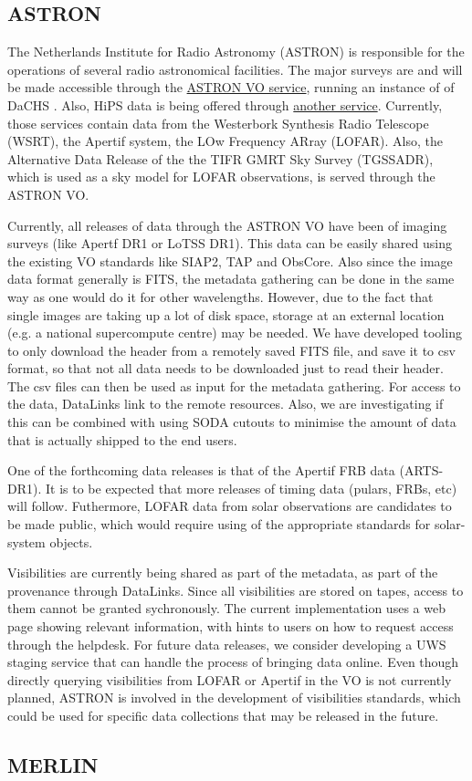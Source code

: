 \documentclass[11pt,a4paper]{ivoa}
\begin{document}
\subsection{ASTRON}\label{sec:Astron}
The Netherlands Institute for Radio Astronomy (ASTRON) is responsible for the operations of several radio astronomical facilities. The major surveys are and will be made accessible through the   {\href{https://vo.astron.nl/}{ASTRON VO service}}, running an instance of of DaCHS \citep{10.1016/j.ascom.2014.08.003}. Also, HiPS data is being offered through \href{https://hips.astron.nl/}{another service}. Currently, those services contain data from the Westerbork Synthesis Radio Telescope (WSRT), the Apertif system, the LOw Frequency ARray (LOFAR). Also, the Alternative Data Release of the the TIFR GMRT Sky Survey (TGSSADR), which is used as a sky model for LOFAR observations, is served through the ASTRON VO.

Currently, all releases of data through the ASTRON VO have been of imaging surveys (like Apertf DR1 or LoTSS DR1). This data can be easily shared using the existing VO standards like SIAP2, TAP and ObsCore. Also since the image data format generally is FITS, the metadata gathering can be done in the same way as one would do it for other wavelengths. However, due to the fact that single images are taking up a lot of disk space, storage at an external location (e.g. a national supercompute centre) may be needed. We have developed tooling to only download the header from a remotely saved FITS file, and save it to csv format, so that not all data needs to be downloaded just to read their header. The csv files can then be used as input for the metadata gathering. For access to the data, DataLinks link to the remote resources. Also, we are investigating if this can be combined with using SODA cutouts to minimise the amount of data that is actually shipped to the end users.  

One of the forthcoming data releases is that of the Apertif FRB data (ARTS-DR1). It is to be expected that more releases of timing data (pulars, FRBs, etc) will follow. Futhermore, LOFAR data from solar observations are candidates to be made public, which would require using of the appropriate standards for solar-system objects. 

Visibilities are currently being shared as part of the metadata, as part of the provenance through DataLinks. Since all visibilities are stored on tapes, access to them cannot be granted sychronously. The current implementation uses a web page showing relevant information, with hints to users on how to request access through the helpdesk. For future data releases, we consider developing a UWS staging service that can handle the process of bringing data online. Even though directly querying visibilities from LOFAR or Apertif in the VO is not currently planned, ASTRON is involved in the development of visibilities standards, which could be used for specific data collections that may be released in the future. 

\subsection{MERLIN}\label{sec:MERLIN}

\end{document}
